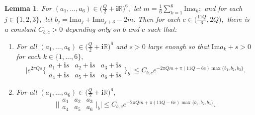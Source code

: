 \documentclass[11pt]{article}
\newtheorem{lemma}[theorem]{Lemma}
\theoremstyle{remark}
\theoremstyle{remark}
\numberwithin{equation}{section}
\begin{document}
\begin{lemma}\label{bib}
 For $(a_1,\dots,a_6)\in \big(\frac{Q}{2}+\mathbf i\mathbb R\big)^6,$ let 
 $m = \frac{1}{6}\sum_{k=1}^6\mathrm{Im}a_k;$
 and for each $j\in\{1,2,3\},$ let 
 $b_j=\mathrm{Im}a_j+\mathrm{Im}a_{j+3}-2m.$ 
 Then for each $c \in \big(\frac{11Q}{6},2Q\big),$ there is a constant $C_{b,c}>0$ depending only on $b$ and $c$ such that:
 \begin{enumerate}[(1)]      
 \item For all $(a_1,\dots,a_6)\in \big(\frac{Q}{2}+\mathbf i\mathbb R)^6$ and  $s>0$ large enough so that $\mathrm{Im}a_k+s>0$ for each $k\in\{1,\dots,6\},$ 
 $$\Bigg|e^{2\pi Q s} \bigg\{\begin{matrix} a_1+\mathbf is & a_2 +\mathbf is & a_3+\mathbf is  \\ a_4+\mathbf is & a_5+\mathbf is & a_6+\mathbf is \end{matrix} \bigg\}_b\Bigg|\leqslant C_{b,c} e^{-2\pi Qm + \pi (11Q-6c)\max\{b_1,b_2,b_3\}}.$$
 

 \item For all $(a_1,\dots,a_6)\in \big(\frac{Q}{2}+\mathbf i\mathbb R)^6,$ 
 $$\Bigg|\bigg|\begin{matrix} a_1 & a_2 & a_3  \\ a_4 & a_5 & a_6 \end{matrix} \bigg|_b\Bigg|\leqslant C_{b,c} e^{-2\pi Qm +\pi  (11Q-6c) \max\{b_1,b_2,b_3\}}.$$
 \end{enumerate}
\end{lemma}
\end{document}
